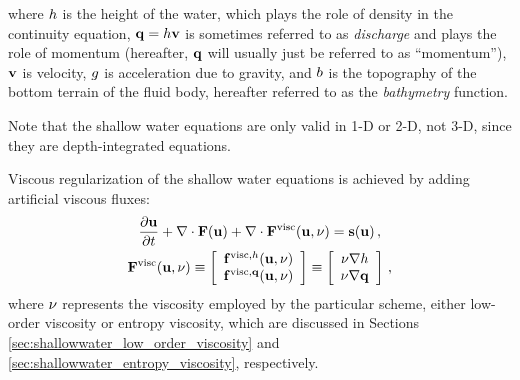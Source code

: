 where $h$ is the height of the water, which plays the role of density
in the continuity equation, $\mathbf{q}=h\mathbf{v}$ is sometimes
referred to as \emph{discharge} and plays the role of momentum (hereafter,
$\mathbf{q}$ will usually just be referred to as ``momentum''),
$\mathbf{v}$ is velocity, $g$
is acceleration due to gravity, and $b$ is the topography of the
bottom terrain of the fluid body, hereafter referred to as the \emph{bathymetry}
function.

Note that the shallow water equations are only valid in 1-D or 2-D, not 3-D,
since they are depth-integrated equations.

Viscous regularization of the shallow water equations is achieved by adding
artificial viscous fluxes:
\begin{equation}
\begin{gathered}
  \ppt{\vectorsolution} + \nabla\cdot\consfluxvector(\vectorsolution)
  + \nabla\cdot\viscconsfluxvector
  = \conssource \eqc
\\
  \viscconsfluxvector
  \equiv \left[\begin{array}{c}
    \viscflux{\height}(\vectorsolution,\viscosity)\\
    \viscflux{\heightmomentum}(\vectorsolution,\viscosity)
    \end{array}\right]
  \equiv \left[\begin{array}{c}
    \viscosity\nabla\height\\
    \viscosity\nabla\heightmomentum
    \end{array}\right] \eqc
\end{gathered}
\end{equation}
where $\nu$ represents the viscosity employed by the particular
scheme, either low-order viscosity or entropy viscosity, which are discussed in
Sections \ref{sec:shallowwater_low_order_viscosity} and
\ref{sec:shallowwater_entropy_viscosity}, respectively.
